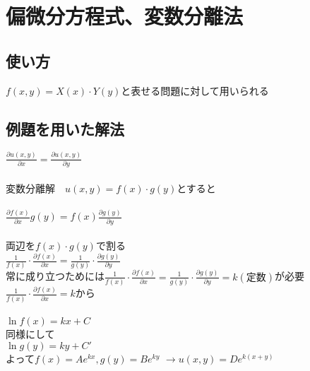 \documentclass[titlepage,dvipdfmx]{jsarticle}
\begin{document}
\section{偏微分方程式、変数分離法}
\subsection*{使い方}
$f(x,y)=X(x)\cdot Y(y)$と表せる問題に対して用いられる
\subsection*{例題を用いた解法}
$\displaystyle \frac{\partial u(x,y)}{\partial x}=\frac{\partial u(x,y)}{\partial y}$\\ \\
変数分離解　$u(x,y)=f(x)\cdot g(y)$とすると\\\\
$\displaystyle \frac{\partial f(x)}{\partial x}g(y)=f(x)\frac{\partial g(y)}{\partial y}$\\ \\
両辺を$f(x)\cdot g(y)$で割る\\

$\displaystyle \frac{1}{f(x)}\cdot \frac{\partial f(x)}{\partial x}=\frac{1}{g(y)}\cdot \frac{\partial g(y)}{\partial y}$\\
常に成り立つためには$\displaystyle \frac{1}{f(x)}\cdot \frac{\partial f(x)}{\partial x}=\frac{1}{g(y)}\cdot \frac{\partial g(y)}{\partial y}=k(定数)$が必要\\
$\displaystyle \frac{1}{f(x)}\cdot \frac{\partial f(x)}{\partial x}=k$から\\\\
$\displaystyle \ln f(x) =kx+C$\\
同様にして\\
$\displaystyle \ln g(y) =ky+C'$\\
よって$f(x)=Ae^{kx},g(y)=Be^{ky}$
$\rightarrow u(x,y)=De^{k(x+y)}$
\end{document}
